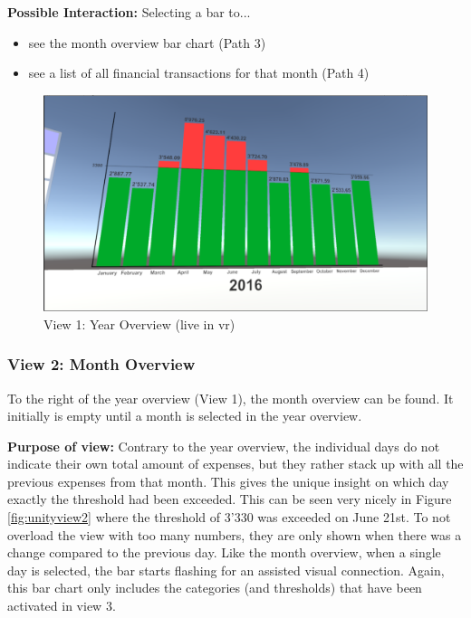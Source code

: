 \textbf{Possible Interaction:} Selecting a bar to...
\begin{itemize}[noitemsep,nolistsep]
	\item see the month overview bar chart (Path 3)
	\item see a list of all financial transactions for that month (Path 4)
\end{itemize}

\begin{figure}[h]
	\begin{center}
		\includegraphics[width=12cm]{03_Figures/08_Development/View1_YearOverview.png}
		\caption{View 1: Year Overview (live in \gls{vr})}
		\label{fig:unityview1}
	\end{center}
\end{figure}


\subsubsection{View 2: Month Overview}

To the right of the year overview (View 1), the month overview can be found. It initially is empty until a month is selected in the year overview.

\textbf{Purpose of view:} Contrary to the year overview, the individual days do not indicate their own total amount of expenses, but they rather stack up with all the previous expenses from that month. This gives the unique insight on which day exactly the threshold had been exceeded. This can be seen very nicely in Figure \ref{fig:unityview2} where the threshold of 3'330 was exceeded on June 21st. To not overload the view with too many numbers, they are only shown when there was a change compared to the previous day. Like the month overview, when a single day is selected, the bar starts flashing for an assisted visual connection. Again, this bar chart only includes the categories (and thresholds) that have been activated in view 3.

